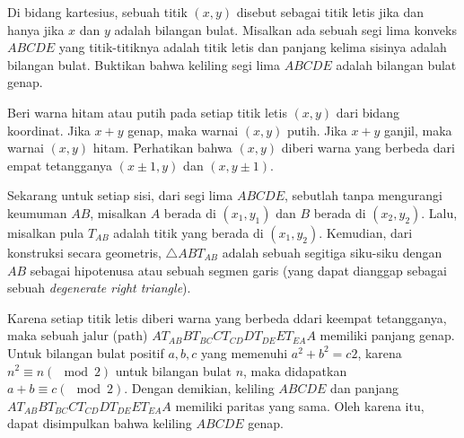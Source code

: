 \documentclass[12pt]{scrartcl}
\begin{document}
\begin{soaljawab}
    Di bidang kartesius, sebuah titik $(x,y)$ disebut sebagai titik letis jika dan
hanya jika $x$ dan $y$ adalah bilangan bulat. Misalkan ada sebuah segi lima konveks $ABCDE$
yang titik-titiknya adalah titik letis dan panjang kelima sisinya adalah bilangan bulat.
Buktikan bahwa keliling segi lima $ABCDE$ adalah bilangan bulat genap.
\begin{solusi}
    Beri warna hitam atau putih pada setiap titik letis $(x,y)$ dari bidang koordinat. Jika $x+y$ genap, maka warnai $(x,y)$ putih. Jika $x+y$ ganjil, maka warnai $(x,y)$ hitam. Perhatikan bahwa $(x,y)$ diberi warna yang berbeda dari empat tetangganya $(x\pm 1,y)$ dan $(x,y\pm 1)$.
    
    Sekarang untuk setiap sisi, dari segi lima $ABCDE$, sebutlah tanpa mengurangi keumuman $AB$,  misalkan $A$ berada di $(x_1, y_1)$ dan $B$ berada di $(x_2, y_2)$. Lalu, misalkan pula $T_{AB}$ adalah titik  yang berada di $(x_1,y_2)$. Kemudian, dari konstruksi secara geometris, $\triangle ABT_{AB}$ adalah sebuah segitiga siku-siku dengan $AB$ sebagai hipotenusa atau sebuah segmen garis (yang dapat dianggap sebagai sebuah \textit{degenerate right triangle}).

     Karena setiap titik letis diberi warna yang berbeda ddari keempat tetangganya, maka sebuah jalur (path) $AT_{AB}BT_{BC}CT_{CD}DT_{DE}ET_{EA}A$ memiliki panjang genap. Untuk bilangan bulat positif $a,b, c$ yang memenuhi $a^2+b^2=c2$, karena $n^2 \equiv n (\mod 2)$ untuk bilangan bulat $n$, maka didapatkan $a+b\equiv c (\mod 2)$. Dengan demikian, keliling $ABCDE$ dan panjang $AT_{AB}BT_{BC}CT_{CD}DT_{DE}ET_{EA}A$ memiliki paritas yang sama. Oleh karena itu, dapat disimpulkan bahwa keliling $ABCDE$ genap.
\end{solusi}
\end{soaljawab}
\end{document}
